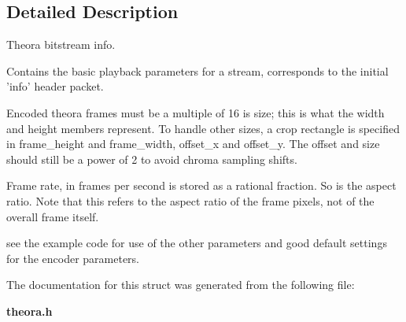 \subsection{Detailed Description}
Theora bitstream info. 

Contains the basic playback parameters for a stream, corresponds to the initial 'info' header packet.

Encoded theora frames must be a multiple of 16 is size; this is what the width and height members represent. To handle other sizes, a crop rectangle is specified in frame\_\-height and frame\_\-width, offset\_\-x and offset\_\-y. The offset and size should still be a power of 2 to avoid chroma sampling shifts.

Frame rate, in frames per second is stored as a rational fraction. So is the aspect ratio. Note that this refers to the aspect ratio of the frame pixels, not of the overall frame itself.

see the example code for use of the other parameters and good default settings for the encoder parameters. 



The documentation for this struct was generated from the following file:\begin{CompactItemize}
\item 
{\bf theora.h}\end{CompactItemize}
